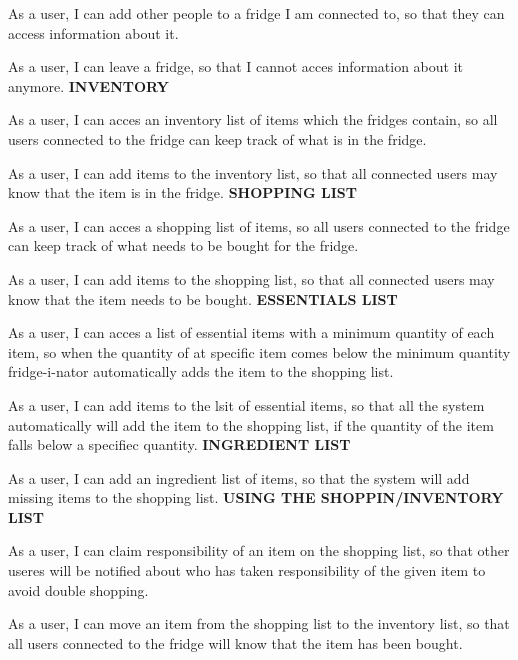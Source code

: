 \documentclass[12pt]{article}
\begin{document}
As a user, I can add other people to a fridge I am connected to, so that they can access information about it.

As a user, I can leave a fridge, so that I cannot acces information about it anymore.
\newline
\newline
\textbf{INVENTORY}

As a user, I can acces an inventory list of items which the fridges contain, so all users connected to the fridge can keep track of what is in the fridge.

As a user, I can add items to the inventory list, so that all connected users may know that the item is in the fridge.
\newline
\newline
\textbf{SHOPPING LIST}

As a user, I can acces a shopping list of items, so all users connected to the fridge can keep track of what needs to be bought for the fridge.

As a user, I can add items to the shopping list, so that all connected users may know that the item needs to be bought.
\newline
\newline
\textbf{ESSENTIALS LIST}

As a user, I can acces a list of essential items with a minimum quantity of each item, so when the quantity of at specific item comes below the minimum quantity fridge-i-nator automatically adds the item to the shopping list.

As a user, I can add items to the lsit of essential items, so that all the system automatically will add the item to the shopping list, if the quantity of the item falls below a specifiec quantity.
\newline
\newline
\textbf{INGREDIENT LIST}

As a user, I can add an ingredient list of items, so that the system will add missing items to the shopping list.
\newline
\newline
\textbf{USING THE SHOPPIN/INVENTORY LIST}

As a user, I can claim responsibility of an item on the shopping list, so that other useres will be notified about who has taken responsibility of the given item to avoid double shopping.

As a user, I can move an item from the shopping list to the inventory list, so that all users connected to the fridge will know that the item has been bought.
\end{document}
